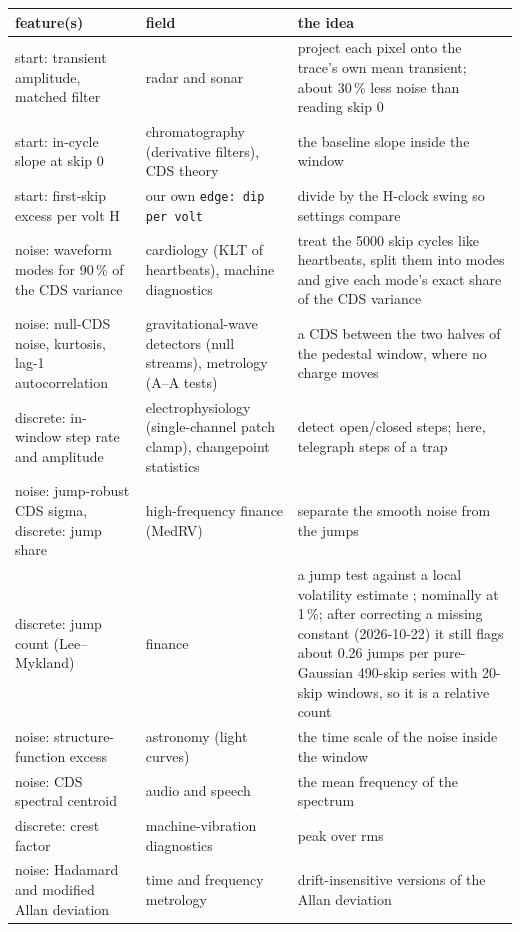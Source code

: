 \documentclass[10pt]{article}
\newcommand{\code}[1]{\texttt{#1}}
\begin{document}
\begin{table}[H]
\centering\small
\begin{tabularx}{\textwidth}{>{\raggedright\arraybackslash}p{4.4cm}>{\raggedright\arraybackslash}p{3.2cm}L}
\toprule
feature(s) & field & the idea \\
\midrule
start: transient amplitude, matched filter & radar and sonar & project each pixel onto the trace's own mean transient; about 30\,\% less noise than reading skip 0 \\
start: in-cycle slope at skip 0 & chromatography (derivative filters), CDS theory & the baseline slope inside the window \\
start: first-skip excess per volt H & our own \code{edge: dip per volt} & divide by the H-clock swing so settings compare \\
noise: waveform modes for 90\,\% of the CDS variance & cardiology (KLT of heartbeats), machine diagnostics & treat the 5000 skip cycles like heartbeats, split them into modes and give each mode's exact share of the CDS variance \\
noise: null-CDS noise, kurtosis, lag-1 autocorrelation & gravitational-wave detectors (null streams), metrology (A--A tests) & a CDS between the two halves of the pedestal window, where no charge moves \\
discrete: in-window step rate and amplitude & electrophysiology (single-channel patch clamp), changepoint statistics & detect open/closed steps; here, telegraph steps of a trap \\
noise: jump-robust CDS sigma, discrete: jump share & high-frequency finance (MedRV) & separate the smooth noise from the jumps \cite{ads2012} \\
discrete: jump count (Lee--Mykland) & finance & a jump test against a local volatility estimate \cite{lm2008}; nominally at 1\,\%; after correcting a missing constant (2026-10-22) it still flags about 0.26 jumps per pure-Gaussian 490-skip series with 20-skip windows, so it is a relative count \\
noise: structure-function excess & astronomy (light curves) & the time scale of the noise inside the window \\
noise: CDS spectral centroid & audio and speech & the mean frequency of the spectrum \\
discrete: crest factor & machine-vibration diagnostics & peak over rms \\
noise: Hadamard and modified Allan deviation & time and frequency metrology & drift-insensitive versions of the Allan deviation \cite{riley2008} \\

\end{tabularx}
\end{table}
\end{document}

